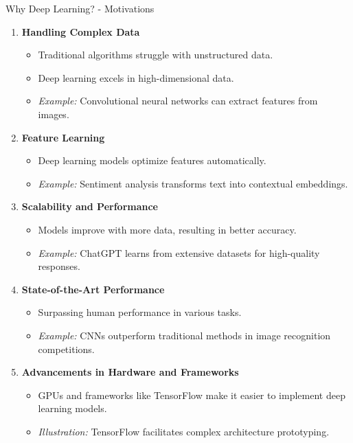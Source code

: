 \documentclass[aspectratio=169]{beamer}
\begin{document}
\begin{frame}[fragile]{Why Deep Learning? - Motivations}
    \begin{enumerate}
        \item \textbf{Handling Complex Data}
            \begin{itemize}
                \item Traditional algorithms struggle with unstructured data.
                \item Deep learning excels in high-dimensional data.
                \item \textit{Example:} Convolutional neural networks can extract features from images.
            \end{itemize}
        
        \item \textbf{Feature Learning}
            \begin{itemize}
                \item Deep learning models optimize features automatically.
                \item \textit{Example:} Sentiment analysis transforms text into contextual embeddings.
            \end{itemize}

        \item \textbf{Scalability and Performance}
            \begin{itemize}
                \item Models improve with more data, resulting in better accuracy.
                \item \textit{Example:} ChatGPT learns from extensive datasets for high-quality responses.
            \end{itemize}
        
        \item \textbf{State-of-the-Art Performance}
            \begin{itemize}
                \item Surpassing human performance in various tasks.
                \item \textit{Example:} CNNs outperform traditional methods in image recognition competitions.
            \end{itemize}

        \item \textbf{Advancements in Hardware and Frameworks}
            \begin{itemize}
                \item GPUs and frameworks like TensorFlow make it easier to implement deep learning models.
                \item \textit{Illustration:} TensorFlow facilitates complex architecture prototyping.
            \end{itemize}
    \end{enumerate}
\end{frame}
\end{document}
